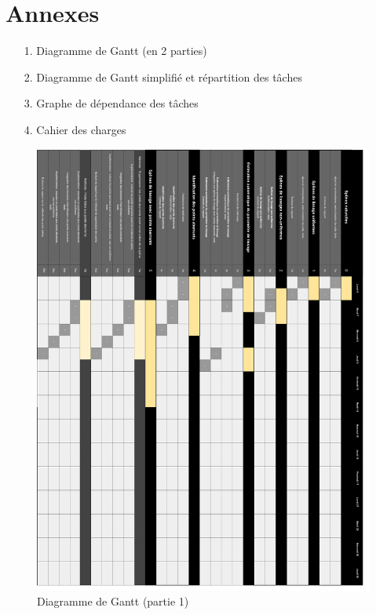 \documentclass[a4paper,12pt]{article} %
\begin{document}
\section*{Annexes}

\begin{itemize}
\item[1.] Diagramme de Gantt (en 2 parties)
\item[2.] Diagramme de Gantt simplifié et répartition des tâches
\item[3.] Graphe de dépendance des tâches
\item[4.] Cahier des charges
\end{itemize}
\begin{figure}
\begin{center}
\includegraphics[width=16cm]{p1.png} 
\end{center}
\caption{Diagramme de Gantt (partie 1)}
\label{DiagG1}
\end{figure}
\end{document}
